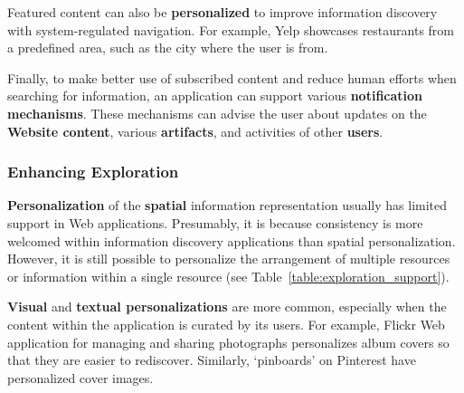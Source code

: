 \documentclass{sigchi}
\begin{document}
{{\begin{table}[ht!]
\begin{tabular}{|p{0.35\linewidth}|p{0.60\linewidth}|}
\end{tabular}
\end{table}

Featured content can also be \textbf{personalized} to improve information discovery with system-regulated navigation. For example, Yelp showcases restaurants from a predefined area, such as the city where the user is from.

Finally, to make better use of subscribed content and reduce human efforts when searching for information, an application can support various \textbf{notification mechanisms}. These mechanisms can advise the user about updates on the \textbf{Website content}, various \textbf{artifacts}, and activities of other \textbf{users}.  

} %
{\subsubsection{Enhancing Exploration}
\textbf{Personalization} of the \textbf{spatial} information representation usually has limited support in Web applications. Presumably, it is because consistency is more welcomed within information discovery applications than spatial personalization. However, it is still possible to personalize the arrangement of multiple resources or information within a single resource (see Table~\ref{table:exploration_support}). 

\textbf{Visual} and \textbf{textual personalizations} are more common, especially when the content within the application is curated by its users.  For example, Flickr Web application for managing and sharing photographs personalizes album covers so that they are easier to rediscover. Similarly, `pinboards' on Pinterest have personalized cover images.

}}
\end{document}
